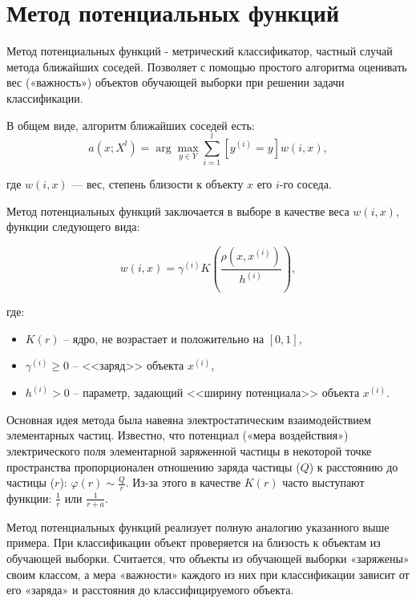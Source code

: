 \section{Метод потенциальных функций}

Метод потенциальных функций - метрический классификатор, частный случай метода ближайших соседей. Позволяет с помощью простого алгоритма оценивать вес («важность») объектов обучающей выборки при решении задачи классификации.

В общем виде, алгоритм ближайших соседей есть:
\begin{equation*}
	\displaystyle a(x; X^l) = \arg\max_{y\in Y} \sum\limits_{i=1}^l[y^{(i)}=y]w(i,x), 
\end{equation*}

где $w(i,x)$ — вес, степень близости к объекту $x$ его $i$-го соседа.

Метод потенциальных функций заключается в выборе в качестве веса $w(i,x)$, функции следующего вида:

\begin{equation*}
    \displaystyle w(i,x) = \gamma^{(i)} K\left(\frac{\rho(x, x^{(i)})}{h^{(i)}}\right),
\end{equation*}

где:

\begin{itemize}
	\item $K(r)$ -- ядро, не возрастает и положительно на $[0, 1]$,
	\item $\gamma^{(i)} \ge 0$ -- <<заряд>> объекта $x^{(i)}$, 
	\item $h^{(i)} > 0$ -- параметр, задающий <<ширину потенциала>> объекта $x^{(i)}$. 
\end{itemize}

Основная идея метода была навеяна электростатическим взаимодействием элементарных частиц. Известно, что потенциал («мера воздействия») электрического поля элементарной заряженной частицы в некоторой точке пространства пропорционален отношению заряда частицы ($Q$) к расстоянию до частицы ($r$): $\varphi(r) \sim \frac{Q}{r}$. Из-за этого в качестве $K(r)$ часто выступают функции: $\frac{1}{r}$ или $\frac{1}{r+a}$.

Метод потенциальных функций реализует полную аналогию указанного выше примера. При классификации объект проверяется на близость к объектам из обучающей выборки. Считается, что объекты из обучающей выборки «заряжены» своим классом, а мера «важности» каждого из них при классификации зависит от его «заряда» и расстояния до классифицируемого объекта.

